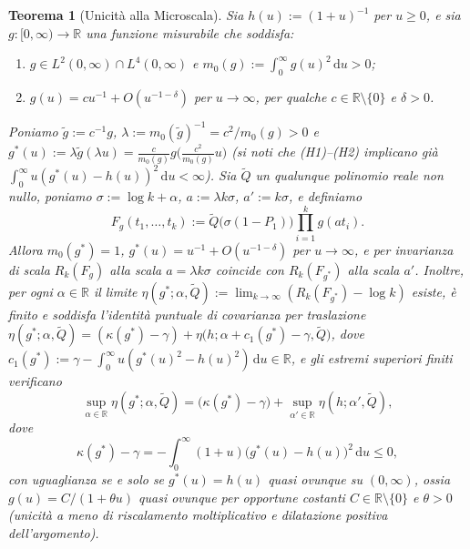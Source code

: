 \documentclass[11pt, reqno]{amsart}
\newtheorem{theorem}{Teorema}
\theoremstyle{remark}
\numberwithin{equation}{section}
\newcommand{\R}{\mathbb{R}}
\newcommand{\dd}{\,\mathrm{d}}
\begin{document}
\begin{theorem}[Unicità alla Microscala]\label{thm:uniqueness}
Sia $h(u) := (1+u)^{-1}$ per $u \ge 0$, e sia $g \colon [0,\infty) \to \R$ una funzione misurabile
che soddisfa:
\begin{enumerate}
\item[(H1)] $g \in L^2(0,\infty) \cap L^4(0,\infty)$ e $m_0(g) := \int_0^\infty g(u)^2 \dd u > 0$;
\item[(H2)] $g(u) = c u^{-1} + O(u^{-1-\delta})$ per $u \to \infty$, per qualche $c \in \R \setminus \{0\}$ e $\delta > 0$.
\end{enumerate}
Poniamo $\tilde{g} := c^{-1} g$, $\lambda := m_0(\tilde{g})^{-1} = c^2 / m_0(g) > 0$ e
$g^*(u) := \lambda \tilde{g}(\lambda u) = \frac{c}{m_0(g)} g\bigl(\frac{c^2}{m_0(g)} u\bigr)$
(si noti che (H1)--(H2) implicano già $\int_0^\infty u(g^*(u)-h(u))^2\dd u < \infty$). Sia $\widetilde{Q}$
un qualunque polinomio reale non nullo, poniamo $\sigma := \log k + \alpha$, $a := \lambda k\sigma$,
$a' := k\sigma$, e definiamo
\begin{equation}\label{eq:Fg-def}
F_g(t_1,\dots,t_k) := \widetilde{Q}\bigl(\sigma(1 - P_1)\bigr) \prod_{i=1}^k g(a t_i).
\end{equation}
Allora $m_0(g^*) = 1$, $g^*(u) = u^{-1} + O(u^{-1-\delta})$ per $u \to \infty$, e per invarianza di
scala $R_k(F_g)$ alla scala $a = \lambda k \sigma$ coincide con $R_k(F_{g^*})$ alla scala $a'$.
Inoltre, per ogni $\alpha \in \R$ il limite $\eta(g^*; \alpha, \widetilde{Q}) := \lim_{k\to\infty}(R_k(F_{g^*}) - \log k)$
esiste, è finito e soddisfa l'identità puntuale di covarianza per traslazione
$\eta(g^*; \alpha, \widetilde{Q}) = (\kappa(g^*) - \gamma) + \eta\bigl(h; \alpha + c_1(g^*) - \gamma, \widetilde{Q}\bigr)$,
dove $c_1(g^*) := \gamma - \int_0^\infty u(g^*(u)^2 - h(u)^2)\dd u \in \R$, e gli
estremi superiori finiti verificano
\begin{equation}\label{eq:shift-covariance}
\sup_{\alpha \in \R} \eta(g^*; \alpha, \widetilde{Q})
= \bigl(\kappa(g^*) - \gamma\bigr) + \sup_{\alpha' \in \R} \eta(h; \alpha', \widetilde{Q}),
\end{equation}
dove
\begin{equation}\label{eq:kappa-penalty}
\kappa(g^*) - \gamma
= -\int_0^\infty (1+u)\bigl(g^*(u) - h(u)\bigr)^2 \dd u \le 0,
\end{equation}
con uguaglianza se e solo se $g^*(u) = h(u)$ quasi ovunque su $(0,\infty)$, ossia
$g(u) = C/(1 + \theta u)$ quasi ovunque per opportune costanti $C \in \R \setminus \{0\}$ e
$\theta > 0$ (unicità a meno di riscalamento moltiplicativo e dilatazione positiva dell'argomento).
\end{theorem}
\end{document}
